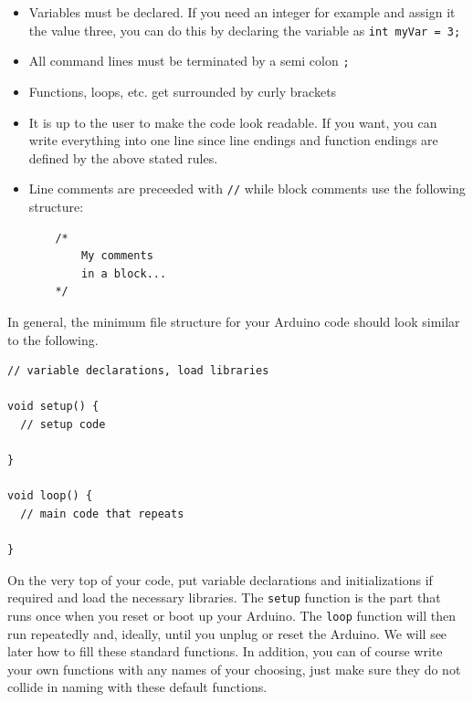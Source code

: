 \begin{itemize}
    \item Variables must be declared. If you need an integer for example and assign it the value three, you can do this by declaring the variable as \lstinline{int myVar = 3;}
    \item All command lines must be terminated by a semi colon \lstinline{;}
    \item Functions, loops, etc. get surrounded by curly brackets
    \item It is up to the user to make the code look readable. If you want, you can write everything into one line since line endings and function endings are defined by the above stated rules.
    \item Line comments are preceeded with \lstinline{//} while block comments use the following structure:
    \begin{lstlisting}
    /*
        My comments
        in a block...
    */
    \end{lstlisting}
\end{itemize}

In general, the minimum file structure for your Arduino code should look similar to the following.
\begin{lstlisting}[frame=single]
// variable declarations, load libraries

void setup() {
  // setup code

}

void loop() {
  // main code that repeats

}
\end{lstlisting}
On the very top of your code, put variable declarations and initializations if required and load the necessary libraries. The \lstinline{setup} function is the part that runs once when you reset or boot up your Arduino. The \lstinline{loop} function will then run repeatedly and, ideally, until you unplug or reset the Arduino. We will see later how to fill these standard functions. In addition, you can of course write your own functions with any names of your choosing, just make sure they do not collide in naming with these default functions. 


